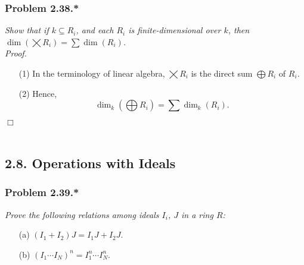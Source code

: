 \documentclass{article}
\begin{document}



\subsubsection*{Problem 2.38.*}
\emph{Show that if $k \subseteq R_i$,
and each $R_i$ is finite-dimensional over $k$, then
$\dim\left(\bigtimes R_i\right) = \sum \dim(R_i)$.} \\

\emph{Proof.}
\begin{enumerate}
\item[(1)]
  In the terminology of linear algebra,
  $\bigtimes R_i$ is the direct sum $\bigoplus R_i$ of $R_i$.

\item[(2)]
  Hence,
  \[
    \dim_{k} \left(\bigoplus R_i\right) = \sum \dim_{k}(R_i).
  \]
\end{enumerate}
$\Box$ \\\\






\subsection*{2.8. Operations with Ideals \\}



\subsubsection*{Problem 2.39.*}
\emph{Prove the following relations among ideals $I_i$, $J$ in a ring $R$:} \\
\begin{enumerate}
\item[(a)]
  $(I_1 + I_2) J = I_1 J + I_2 J$.

\item[(b)]
  $(I_1 \cdots I_N)^n = I_1^n \cdots I_N^n$. \\
\end{enumerate}
\end{document}
